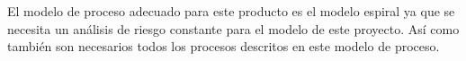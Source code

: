 El modelo de proceso adecuado para este producto es el modelo espiral ya que se necesita un análisis de riesgo constante para el modelo de este proyecto. Así como también son necesarios todos los procesos descritos en este modelo de proceso.

